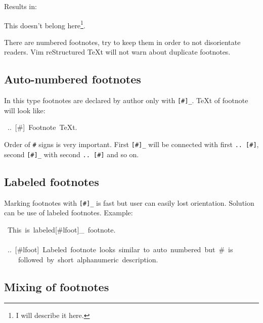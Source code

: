 \documentclass[12pt]{article}
\begin{document}
Results in:

This doesn't belong here\footnote{I will describe it here.
}.

There are numbered footnotes, try to keep them in order to not
disorientate readers. Vim reStructured \TeX{}t will not warn about duplicate footnotes.

\hypertarget{lauto-numbered-footnotes}{}
\subsection{Auto-numbered footnotes}

In this type footnotes are declared by author only with \texttt{[\#]\_}. \TeX{}t of
footnote will look like:

\begin{ttfamily}\begin{flushleft}
\mbox{~..~[\#]~Footnote~\TeX{}t.}\\
\end{flushleft}\end{ttfamily}

Order of \texttt{\#} signs is very important. First \texttt{[\#]\_} will be
connected with first \texttt{.. [\#]}, second \texttt{[\#]\_} with second \texttt{.. [\#]}
and so on.

\hypertarget{llabeled-footnotes}{}
\subsection{Labeled footnotes}

Marking footnotes with \texttt{[\#]\_} is fast but user can easily lost orientation.
Solution can be use of labeled footnotes. Example:

\begin{ttfamily}\begin{flushleft}
\mbox{~This~is~labeled[\#lfoot]\_~footnote.}\\
\mbox{}\\
\mbox{~..~[\#lfoot]~Labeled~footnote~looks~similar~to~auto~numbered~but~\#~is}\\
\mbox{~~~~followed~by~short~alphanumeric~description.}\\
\end{flushleft}\end{ttfamily}

\hypertarget{lmixing-of-footnotes}{}
\subsection{Mixing of footnotes}
\end{document}
